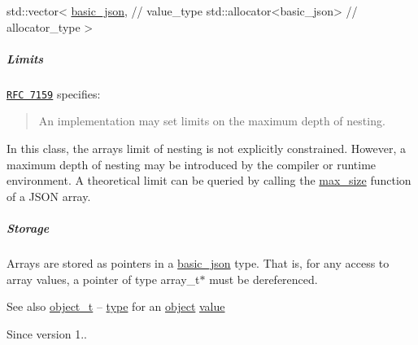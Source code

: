 \begin{DoxyCode}
std::vector<
  \hyperlink{classnlohmann_1_1basic__json_a19734fbc9c97d536832892ddacd6b62a}{basic\_json}, \textcolor{comment}{// value\_type}
  std::allocator<basic\_json> \textcolor{comment}{// allocator\_type}
>
\end{DoxyCode}


\subparagraph*{Limits}

\href{http://rfc7159.net/rfc7159}{\tt R\+FC 7159} specifies\+: \begin{quote}
An implementation may set limits on the maximum depth of nesting. \end{quote}


In this class, the array\textquotesingle{}s limit of nesting is not explicitly constrained. However, a maximum depth of nesting may be introduced by the compiler or runtime environment. A theoretical limit can be queried by calling the \hyperlink{classnlohmann_1_1basic__json_a1b46c6631e30b8394e89bd1546d69736}{max\+\_\+size} function of a J\+S\+ON array.

\subparagraph*{Storage}

Arrays are stored as pointers in a \hyperlink{classnlohmann_1_1basic__json}{basic\+\_\+json} type. That is, for any access to array values, a pointer of type {\ttfamily array\+\_\+t$\ast$} must be dereferenced.

\begin{DoxySeeAlso}{See also}
\hyperlink{classnlohmann_1_1basic__json_a5e3df077f880583a96d74cd63e173cb2}{object\+\_\+t} -- \hyperlink{classnlohmann_1_1basic__json_a5b7c4b35a0ad9f97474912a08965d7ad}{type} for an \hyperlink{classnlohmann_1_1basic__json_a9a4df356e05415438fadf8a15e583903}{object} \hyperlink{classnlohmann_1_1basic__json_ac9e014095170d72c4c57e3daf8efc059}{value}
\end{DoxySeeAlso}
\begin{DoxySince}{Since}
version 1.. 
\end{DoxySince}
